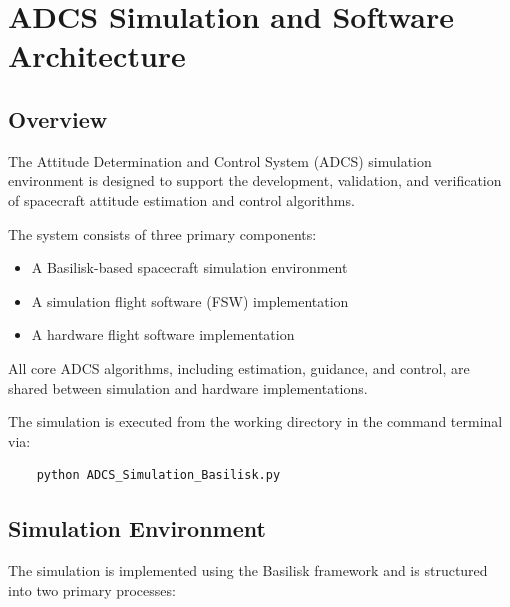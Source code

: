 \chapter{ADCS Simulation and Software Architecture}

\section{Overview}

The Attitude Determination and Control System (ADCS) simulation environment is designed to support the development, validation, and verification of spacecraft attitude estimation and control algorithms.

The system consists of three primary components:

\begin{itemize}
	\item A Basilisk-based spacecraft simulation environment
	\item A simulation flight software (FSW) implementation
	\item A hardware flight software implementation
\end{itemize}

All core ADCS algorithms, including estimation, guidance, and control, are shared between simulation and hardware implementations.

\vspace{0.5em}

The simulation is executed from the working directory in the command terminal via:

\begin{verbatim}
	python ADCS_Simulation_Basilisk.py
\end{verbatim}


\section{Simulation Environment}

The simulation is implemented using the Basilisk framework and is structured into two primary processes:


